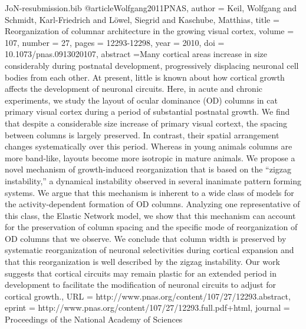 \documentclass{article}
\begin{document}
\begin{filecontents}{JoN-resubmission.bib}
@article{Wolfgang2011PNAS,
author = {Keil, Wolfgang and Schmidt, Karl-Friedrich and Löwel, Siegrid and Kaschube, Matthias},
title = {Reorganization of columnar architecture in the growing visual cortex},
volume = {107},
number = {27},
pages = {12293-12298},
year = {2010},
doi = {10.1073/pnas.0913020107},
abstract ={Many cortical areas increase in size considerably during postnatal development, progressively displacing neuronal cell bodies from each other. At present, little is known about how cortical growth affects the development of neuronal circuits. Here, in acute and chronic experiments, we study the layout of ocular dominance (OD) columns in cat primary visual cortex during a period of substantial postnatal growth. We find that despite a considerable size increase of primary visual cortext, the spacing between columns is largely preserved. In contrast, their spatial arrangement changes systematically over this period. Whereas in young animals columns are more band-like, layouts become more isotropic in mature animals. We propose a novel mechanism of growth-induced reorganization that is based on the “zigzag instability,” a dynamical instability observed in several inanimate pattern forming systems. We argue that this mechanism is inherent to a wide class of models for the activity-dependent formation of OD columns. Analyzing one representative of this class, the Elastic Network model, we show that this mechanism can account for the preservation of column spacing and the specific mode of reorganization of OD columns that we observe. We conclude that column width is preserved by systematic reorganization of neuronal selectivities during cortical expansion and that this reorganization is well described by the zigzag instability. Our work suggests that cortical circuits may remain plastic for an extended period in development to facilitate the modification of neuronal circuits to adjust for cortical growth.},
URL = {http://www.pnas.org/content/107/27/12293.abstract},
eprint = {http://www.pnas.org/content/107/27/12293.full.pdf+html},
journal = {Proceedings of the National Academy of Sciences}
}


\end{filecontents}
\end{document}
